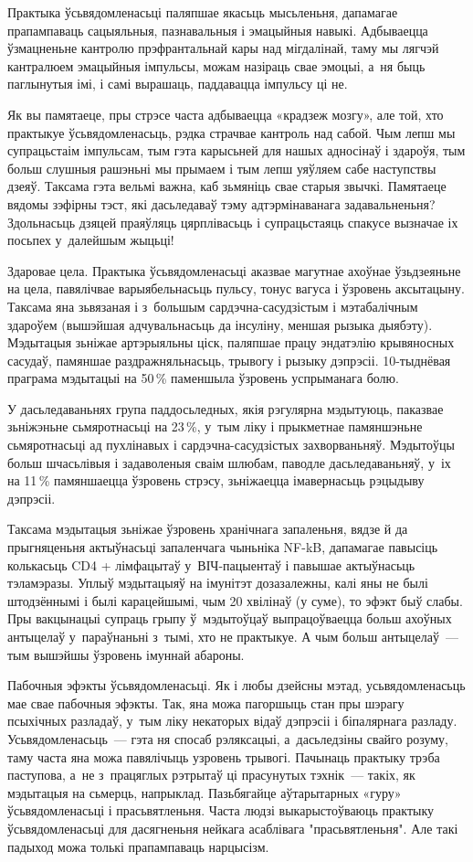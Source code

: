 Практыка ўсьвядомленасьці паляпшае якасьць мысьленьня, дапамагае прапампаваць сацыяльныя, пазнавальныя і эмацыйныя навыкі. Адбываецца ўзмацненьне кантролю прэфрантальнай кары над мігдалінай, таму мы лягчэй кантралюем эмацыйныя імпульсы, можам назіраць свае эмоцыі, а~ня быць паглынутыя імі, і самі вырашаць, паддавацца імпульсу ці не.

Як вы памятаеце, пры стрэсе часта адбываецца «крадзеж мозгу», але той, хто практыкуе ўсьвядомленасьць, рэдка страчвае кантроль над сабой. Чым лепш мы супрацьстаім імпульсам, тым гэта карысьней для нашых адносінаў і здароўя, тым больш слушныя рашэньні мы прымаем і тым лепш уяўляем сабе наступствы дзеяў. Таксама гэта вельмі важна, каб зьмяніць свае старыя звычкі. Памятаеце вядомы зэфірны тэст, які дасьледаваў тэму адтэрмінаванага задавальненьня? Здольнасьць дзяцей праяўляць цярплівасьць і супрацьстаяць спакусе вызначае іх посьпех у~далейшым жыцьці!

Здаровае цела. Практыка ўсьвядомленасьці аказвае магутнае ахоўнае ўзьдзеяньне на цела, павялічвае варыябельнасьць пульсу, тонус вагуса і ўзровень аксытацыну. Таксама яна зьвязаная і з~большым сардэчна-сасудзістым і мэтабалічным здароўем (вышэйшая адчувальнасьць да інсуліну, меншая рызыка дыябэту). Мэдытацыя зьніжае артэрыяльны ціск, паляпшае працу эндатэлію крывяносных сасудаў, памяншае раздражняльнасьць, трывогу і рызыку дэпрэсіі. 10-тыднёвая праграма мэдытацыі на 50\,\% паменшыла ўзровень успрыманага болю.

У дасьледаваньнях група паддосьледных, якія рэгулярна мэдытуюць, паказвае зьніжэньне сьмяротнасьці на 23\,\%, у~тым ліку і прыкметнае памяншэньне сьмяротнасьці ад пухлінавых і сардэчна-сасудзістых захворваньняў. Мэдытоўцы больш шчасьлівыя і задаволеныя сваім шлюбам, паводле дасьледаваньняў, у~іх на 11\,\% памяншаецца ўзровень стрэсу, зьніжаецца імавернасьць рэцыдыву дэпрэсіі.

Таксама мэдытацыя зьніжае ўзровень хранічнага запаленьня, вядзе й да прыгняценьня актыўнасьці запаленчага чыньніка NF-kB, дапамагае павысіць колькасьць CD4 + лімфацытаў у~ВІЧ-пацыентаў і павышае актыўнасьць тэламэразы. Уплыў мэдытацыяў на імунітэт дозазалежны, калі яны не былі штодзённымі і былі карацейшымі, чым 20 хвілінаў (у суме), то эфэкт быў слабы. Пры вакцынацыі супраць грыпу ў~мэдытоўцаў выпрацоўваецца больш ахоўных антыцелаў у~параўнаньні з~тымі, хто не практыкуе. А чым больш антыцелаў~--- тым вышэйшы ўзровень імуннай абароны.

Пабочныя эфэкты ўсьвядомленасьці. Як і любы дзейсны мэтад, усьвядомленасьць мае свае пабочныя эфэкты. Так, яна можа пагоршыць стан пры шэрагу псыхічных разладаў, у~тым ліку некаторых відаў дэпрэсіі і біпалярнага разладу. Усьвядомленасьць~--- гэта ня спосаб рэляксацыі, а~дасьледзіны свайго розуму, таму часта яна можа павялічыць узровень трывогі. Пачынаць практыку трэба паступова, а~не з~працяглых рэтрытаў ці прасунутых тэхнік~--- такіх, як мэдытацыя на сьмерць, напрыклад. Пазьбягайце аўтарытарных «гуру» ўсьвядомленасьці і прасьвятленьня. Часта людзі выкарыстоўваюць практыку ўсьвядомленасьці для дасягненьня нейкага асаблівага "прасьвятленьня". Але такі падыход можа толькі прапампаваць нарцысізм.

